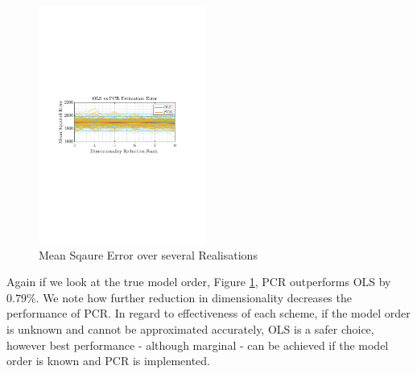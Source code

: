 \documentclass[12pt]{article}
\begin{document}
 	\begin{figure}
 		\begin{centering}
 			\includegraphics[trim={2.2cm 11.2cm 3.15cm  11.2cm}, clip, width=0.49\textwidth]{../MATLAB/figures/q1_6d_fig01.pdf} 
 		\end{centering}
 		\captionsetup{justification=centering}
 		\caption{Mean Sqaure Error over several Realisations}
 		\label{fig: 1-6d}
 	\end{figure}
 
 	Again if we look at the true model order, Figure \ref{fig: 1-6d}, PCR outperforms OLS by $0.79\%$. We note how further reduction in dimensionality decreases the performance of PCR. In regard to effectiveness of each scheme, if the model order is unknown and cannot be approximated accurately, OLS is a safer choice, however best performance - although marginal - can be achieved if the model order is known and PCR is implemented.
 	
 	
\end{document}
